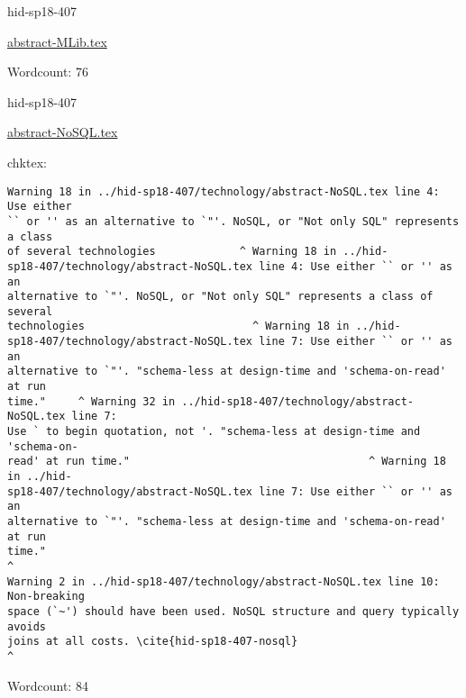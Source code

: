 

\begin{IU}

hid-sp18-407

\href{https://github.com/cloudmesh-community/hid-sp18-407/blob/master//technology/abstract-MLib.tex}{abstract-MLib.tex}

 

Wordcount: 76

\end{IU}



\begin{IU}

hid-sp18-407

\href{https://github.com/cloudmesh-community/hid-sp18-407/blob/master//technology/abstract-NoSQL.tex}{abstract-NoSQL.tex}

 
chktex:
\begin{tiny}
\begin{verbatim}
Warning 18 in ../hid-sp18-407/technology/abstract-NoSQL.tex line 4: Use either
`` or '' as an alternative to `"'. NoSQL, or "Not only SQL" represents a class
of several technologies             ^ Warning 18 in ../hid-
sp18-407/technology/abstract-NoSQL.tex line 4: Use either `` or '' as an
alternative to `"'. NoSQL, or "Not only SQL" represents a class of several
technologies                          ^ Warning 18 in ../hid-
sp18-407/technology/abstract-NoSQL.tex line 7: Use either `` or '' as an
alternative to `"'. "schema-less at design-time and 'schema-on-read' at run
time."     ^ Warning 32 in ../hid-sp18-407/technology/abstract-NoSQL.tex line 7:
Use ` to begin quotation, not '. "schema-less at design-time and 'schema-on-
read' at run time."                                     ^ Warning 18 in ../hid-
sp18-407/technology/abstract-NoSQL.tex line 7: Use either `` or '' as an
alternative to `"'. "schema-less at design-time and 'schema-on-read' at run
time."                                                                  ^
Warning 2 in ../hid-sp18-407/technology/abstract-NoSQL.tex line 10: Non-breaking
space (`~') should have been used. NoSQL structure and query typically avoids
joins at all costs. \cite{hid-sp18-407-nosql}
^
\end{verbatim}
\end{tiny}

Wordcount: 84

\end{IU}

